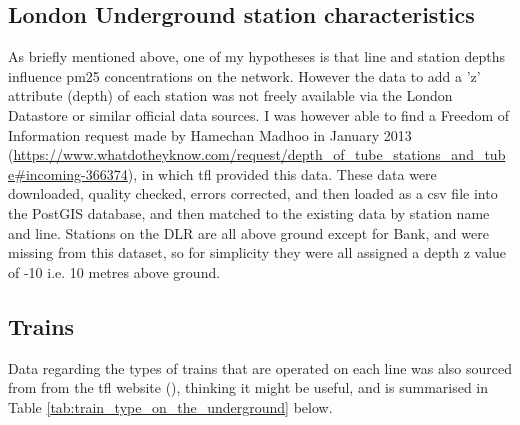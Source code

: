 \subsection{London Underground station characteristics}
\label{subsec:station_characteristics}
As briefly mentioned above, one of my hypotheses is that line and station depths influence \gls{pm25} concentrations on the network. However the data to add a 'z' attribute (depth) of each station was not freely available via the London Datastore or similar official data sources. I was however able to find a Freedom of Information request made by Hamechan Madhoo in January 2013 (\url{https://www.whatdotheyknow.com/request/depth_of_tube_stations_and_tube#incoming-366374}), in which \gls{tfl} provided this data. These data were downloaded, quality checked, errors corrected, and then loaded as a \gls{csv} file into the PostGIS database, and then matched to the existing data by station name and line. Stations on the DLR are all above ground except for Bank, and were missing from this dataset, so for simplicity they were all assigned a depth z value of -10 i.e. 10 metres above ground.

\subsection{Trains}
\label{subsec:trains}
Data regarding the types of trains that are operated on each line was also sourced from from the \gls{tfl} website (\cite{TransportforLondon2016}), thinking it might be useful, and is summarised in Table \ref{tab:train_type_on_the_underground} below.


